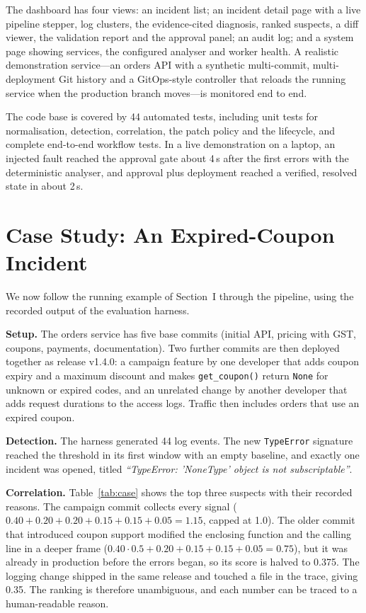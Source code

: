\documentclass[conference]{IEEEtran}
\begin{document}
The dashboard has four views: an incident list; an incident detail page with a live pipeline stepper, log clusters, the evidence-cited diagnosis, ranked suspects, a diff viewer, the validation report and the approval panel; an audit log; and a system page showing services, the configured analyser and worker health. A realistic demonstration service---an orders API with a synthetic multi-commit, multi-deployment Git history and a GitOps-style controller that reloads the running service when the production branch moves---is monitored end to end.

The code base is covered by 44 automated tests, including unit tests for normalisation, detection, correlation, the patch policy and the lifecycle, and complete end-to-end workflow tests. In a live demonstration on a laptop, an injected fault reached the approval gate about 4\,s after the first errors with the deterministic analyser, and approval plus deployment reached a verified, resolved state in about 2\,s.

\section{Case Study: An Expired-Coupon Incident}
\label{sec:case}
We now follow the running example of Section~I through the pipeline, using the recorded output of the evaluation harness.

\textbf{Setup.} The orders service has five base commits (initial API, pricing with GST, coupons, payments, documentation). Two further commits are then deployed together as release v1.4.0: a campaign feature by one developer that adds coupon expiry and a maximum discount and makes \texttt{get\_coupon()} return \texttt{None} for unknown or expired codes, and an unrelated change by another developer that adds request durations to the access logs. Traffic then includes orders that use an expired coupon.

\textbf{Detection.} The harness generated 44 log events. The new \texttt{TypeError} signature reached the threshold in its first window with an empty baseline, and exactly one incident was opened, titled \emph{``TypeError: 'NoneType' object is not subscriptable''}.

\textbf{Correlation.} Table~\ref{tab:case} shows the top three suspects with their recorded reasons. The campaign commit collects every signal ($0.40+0.20+0.20+0.15+0.15+0.05=1.15$, capped at 1.0). The older commit that introduced coupon support modified the enclosing function and the calling line in a deeper frame ($0.40\cdot0.5 + 0.20 + 0.15 + 0.15 + 0.05 = 0.75$), but it was already in production before the errors began, so its score is halved to 0.375. The logging change shipped in the same release and touched a file in the trace, giving 0.35. The ranking is therefore unambiguous, and each number can be traced to a human-readable reason.
\end{document}
